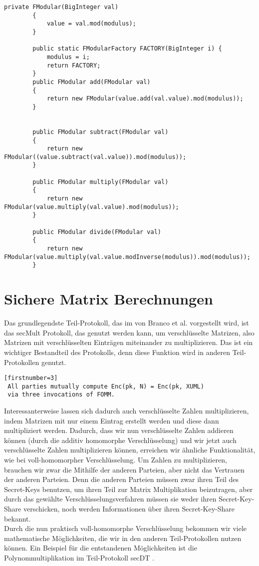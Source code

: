 \begin{lstlisting}[caption = {Ausschnitt aus der neu erstellten Klasse, die Berechnungen in beliebig großen Körpern erlaubt}]
        private FModular(BigInteger val)
        {
            value = val.mod(modulus);
        }

        public static FModularFactory FACTORY(BigInteger i) {
            modulus = i;
            return FACTORY;
        }
        public FModular add(FModular val)
        {
            return new FModular(value.add(val.value).mod(modulus));
        }
        
        
        public FModular subtract(FModular val)
        {
            return new FModular((value.subtract(val.value)).mod(modulus));
        }

        public FModular multiply(FModular val)
        {
            return new FModular(value.multiply(val.value).mod(modulus));
        }
        
        public FModular divide(FModular val)
        {
            return new FModular(value.multiply(val.value.modInverse(modulus)).mod(modulus));
        }
\end{lstlisting}


\section{Sichere Matrix Berechnungen}
Das grundlegendste Teil-Protokoll, das im von Branco et al. \cite{Doettling2021} vorgestellt wird, ist das secMult Protokoll, das genutzt werden kann, um verschlüsselte Matrizen, also Matrizen mit verschlüsselten Einträgen miteinander zu multiplizieren. Das ist ein wichtiger Bestandteil des Protokolls, denn diese Funktion wird in anderen Teil-Protokollen genutzt.\\
\begin{lstlisting}[caption = Ausschnitt aus dem secRank Teil-Protokoll \cite{Doettling2021}][firstnumber=3]
 All parties mutually compute Enc(pk, N) = Enc(pk, XUML)
 via three invocations of FOMM.
\end{lstlisting}
Interessanterweise lassen sich dadurch auch verschlüsselte Zahlen multiplizieren, indem Matrizen mit nur einem Eintrag erstellt werden und diese dann multipliziert werden. Dadurch, dass wir nun verschlüsselte Zahlen addieren können (durch die additiv homomorphe Verschlüsselung) und wir jetzt auch verschlüsselte Zahlen multiplizieren können, erreichen wir ähnliche Funktionalität, wie bei voll-homomorpher Verschlüsselung. Um Zahlen zu multiplizieren, brauchen wir zwar die Mithilfe der anderen Parteien, aber nicht das Vertrauen der anderen Parteien. Denn die anderen Parteien müssen zwar ihren Teil des Secret-Keys benutzen, um ihren Teil zur Matrix Multiplikation beizutragen, aber durch das gewählte Verschlüsselungsverfahren müssen sie weder ihren Secret-Key-Share verschicken, noch werden Informationen über ihren Secret-Key-Share bekannt.\\
Durch die nun praktisch voll-homomorphe Verschlüsselung bekommen wir viele mathematische Möglichkeiten, die wir in den anderen Teil-Protokollen nutzen können.
Ein Beispiel für die entstandenen Möglichkeiten ist die Polynommultiplikation im Teil-Protokoll secDT \cite{Doettling2021}.

